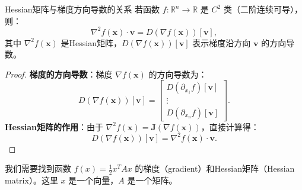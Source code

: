 \documentclass[lang=cn,11pt,a4paper]{elegantpaper}
\begin{document}
    
    
\begin{theorem}{Hessian矩阵与梯度方向导数的关系}
    若函数 \( f: \mathbb{R}^n \to \mathbb{R} \) 是 \( C^2 \) 类（二阶连续可导），则：
    \begin{equation}
    \nabla^2 f(\mathbf{x}) \cdot \mathbf{v} = D(\nabla f(\mathbf{x}))[\mathbf{v}],
    \end{equation}
    其中 \( \nabla^2 f(\mathbf{x}) \) 是Hessian矩阵，\( D(\nabla f(\mathbf{x}))[\mathbf{v}] \) 表示梯度沿方向 \( \mathbf{v} \) 的方向导数。
\end{theorem}
\begin{proof}
        \textbf{梯度的方向导数}：梯度 \( \nabla f(\mathbf{x}) \) 的方向导数为：
        \begin{equation}
        D(\nabla f(\mathbf{x}))[\mathbf{v}] = \begin{bmatrix}
            D(\partial_{x_1} f)[\mathbf{v}] \\
            \vdots \\
            D(\partial_{x_n} f)[\mathbf{v}]
        \end{bmatrix}.
        \end{equation}
        \textbf{Hessian矩阵的作用}：由于 \( \nabla^2 f(\mathbf{x}) = \mathbf{J}(\nabla f(\mathbf{x})) \)，直接计算得：
        \begin{equation}
        D(\nabla f(\mathbf{x}))[\mathbf{v}] = \nabla^2 f(\mathbf{x}) \cdot \mathbf{v}.
        \end{equation}
\end{proof}

\begin{example}
我们需要找到函数 \( f(x) = \frac{1}{2} x^T A x \) 的梯度（gradient）和Hessian矩阵（Hessian matrix）。这里 \( x \) 是一个向量，\( A \) 是一个矩阵。
\end{example}
\end{document}

